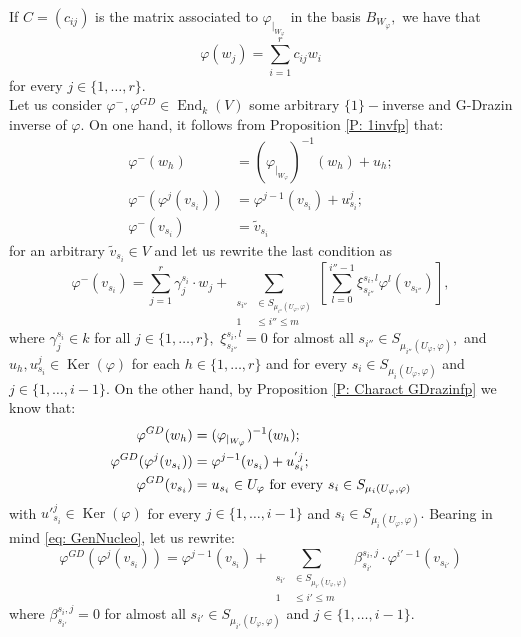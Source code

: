 \documentclass[10pt,a4paper]{amsart}
\theoremstyle{plain}
\theoremstyle{remark}
\numberwithin{equation}{section} \numberwithin{defn}{section}
\newcommand\ed{\operatorname{End}}
\newcommand\Ker{\operatorname{Ker}}
\newcommand{\f}{\varphi}
\begin{document}
If $C=(c_{ij})$ is the matrix associated to $\f_{\vert_{W_{\f}}}$ in the basis $B_{W_{\f}},$ we have that $$\f(w_{j})=\sum_{i=1}^{r}c_{ij}w_i $$ for every $j\in \{1,\dots,r \}.$\\ Let us consider $\f^-, \f^{GD}\in \ed_k(V)$ some arbitrary $\{1\}-$inverse and G-Drazin inverse of $\f.$ On one hand, it follows from Proposition \ref{P: 1invfp} that:
\begin{align*}
\f^-(w_h)& =(\f_{\vert_{W_{\f}}})^{-1}(w_h)+u_h;\\
\f^-(\f^j(v_{s_i}))&=\f^{j-1}(v_{s_i})+u^j_{s_i};\\
\f^-(v_{s_i}) & =\tilde{v}_{s_i}
\end{align*}
for an arbitrary $\tilde{v}_{s_i}\in V$ and let us rewrite the last condition as 
\begin{equation}\label{eq: fmenosgen}
\f^-(v_{s_i})= \sum_{j=1}^r \gamma_j^{s_i}\cdot w_j + \underset {\begin{aligned} s_{i''} &\in S_{{\mu}_{i''} (U_\varphi, \varphi)} \\ 1 &\leq i'' \leq m \end{aligned}} \sum [\sum_{l=0}^{i''-1} \xi_{s_{i''}}^{s_i,l} \varphi^{l} ({{v_{s_{i''}}}})],
\end{equation}
where $\gamma_j^{s_i}\in k$ for all $j\in \{1,\dots,r\},$ $\xi_{s_{i''}}^{s_i,l}=0$ for almost all $s_{i''}\in S_{{\mu}_{i''}(U_\varphi, \varphi)},$ and $u_h,u^j_{s_i} \in \Ker(\f)$ for each $h\in \{1,\dots,r\}$ and for every $ s_i \in S_{{\mu}_i (U_{\f}, \f)}$  and $j\in \{1, \dots, i-1\}.$
On the other hand, by Proposition \ref{P: Charact GDrazinfp} we know that: 
\begin{align*}
\f^{GD}(w_h)&=(\f_{\vert_{ W_{\f}}})^{-1}(w_h);\bigskip \\
\f^{GD}(\f^j(v_{s_i}))&=\f^{j-1}(v_{s_i})+u^{'j}_{s_i};\\
\f^{GD}(v_{s_i})&=u_{s_i}\in U_{\f} \text{ for every }s_i\in S_{{\mu}_{i}(U_\varphi, \varphi)}
\end{align*}
 with  $u'^j_{s_i}\in \Ker(\f)$ for every  $j\in\{1,\dots,i-1 \}$ and $s_i\in S_{{\mu}_{i}(U_\varphi, \varphi)}.$ Bearing in mind \eqref{eq: GenNucleo}, let us rewrite: \begin{equation}\label{eq fgdfjota}
 \f^{GD}(\f^j(v_{s_i}))=\f^{j-1}(v_{s_i})+\underset {\begin{aligned} s_{i'} &\in S_{{\mu}_{i'} (U_\varphi, \varphi)} \\ 1 &\leq i' \leq m \end{aligned}} \sum \beta_{s_{i'}}^{s_i,j}\cdot \varphi^{i'-1} ({{v_{s_{i'}}}})
 \end{equation}
where $\beta_{s_{i'}}^{s_i,j}=0$ for almost all $s_{i'}\in S_{{\mu}_{i'} (U_\varphi, \varphi)}$ and $j\in \{1,\dots,i-1\}.$
\end{document}
